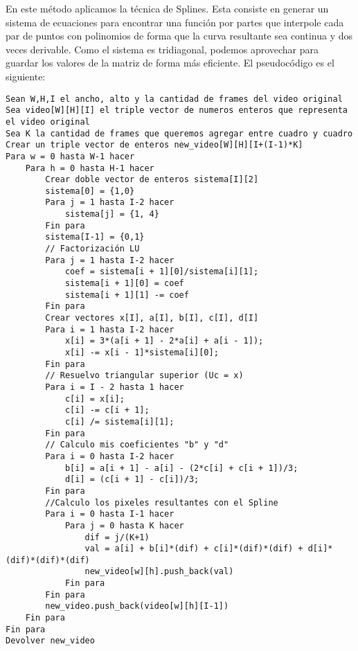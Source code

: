 En este método aplicamos la técnica de Splines. Esta consiste en generar un sistema de ecuaciones para encontrar una función por partes que interpole cada par de puntos con polinomios de forma que la curva resultante sea continua y dos veces derivable. Como el sistema es tridiagonal, podemos aprovechar para guardar los valores de la matriz de forma más eficiente. El pseudocódigo es el siguiente:

\begin{lstlisting}
Sean W,H,I el ancho, alto y la cantidad de frames del video original
Sea video[W][H][I] el triple vector de numeros enteros que representa el video original
Sea K la cantidad de frames que queremos agregar entre cuadro y cuadro
Crear un triple vector de enteros new_video[W][H][I+(I-1)*K]
Para w = 0 hasta W-1 hacer
	Para h = 0 hasta H-1 hacer
		Crear doble vector de enteros sistema[I][2]
		sistema[0] = {1,0}
		Para j = 1 hasta I-2 hacer
			sistema[j] = {1, 4}
		Fin para
		sistema[I-1] = {0,1}
		// Factorización LU
		Para j = 1 hasta I-2 hacer
			coef = sistema[i + 1][0]/sistema[i][1];
			sistema[i + 1][0] = coef
			sistema[i + 1][1] -= coef
		Fin para
		Crear vectores x[I], a[I], b[I], c[I], d[I]
		Para i = 1 hasta I-2 hacer
			x[i] = 3*(a[i + 1] - 2*a[i] + a[i - 1]);
			x[i] -= x[i - 1]*sistema[i][0];
		Fin para
		// Resuelvo triangular superior (Uc = x)
		Para i = I - 2 hasta 1 hacer
			c[i] = x[i];
			c[i] -= c[i + 1];
			c[i] /= sistema[i][1];
		Fin para
		// Calculo mis coeficientes "b" y "d"
		Para i = 0 hasta I-2 hacer
			b[i] = a[i + 1] - a[i] - (2*c[i] + c[i + 1])/3;
			d[i] = (c[i + 1] - c[i])/3;
		Fin para
		//Calculo los pixeles resultantes con el Spline
		Para i = 0 hasta I-1 hacer
			Para j = 0 hasta K hacer
				dif = j/(K+1)
				val = a[i] + b[i]*(dif) + c[i]*(dif)*(dif) + d[i]*(dif)*(dif)*(dif)
				new_video[w][h].push_back(val)
			Fin para
		Fin para
		new_video.push_back(video[w][h][I-1])
	Fin para
Fin para
Devolver new_video
\end{lstlisting}
